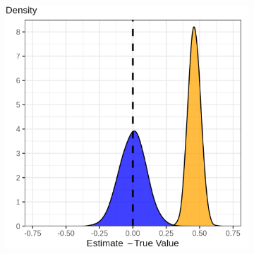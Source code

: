\documentclass[dvipsnames]{beamer} %
\begin{document}
\begin{frame}
{{\begin{figure}
\begin{subfigure}[c]{0.525\textwidth}
                \includegraphics[width=\textwidth]{
                    ../text/sections/figures/normal-indirect-dist.png}
            \end{subfigure}
        \end{figure}
    }}
\end{frame}
\end{document}
